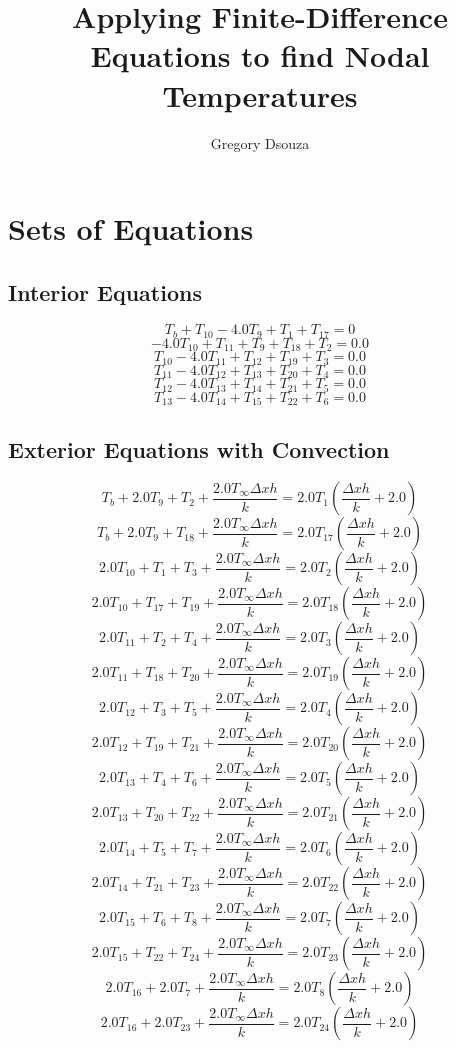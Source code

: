 \documentclass[12pt, stu, floatsintext, hidelinks]{apa7}
\title{Applying Finite-Difference Equations to find Nodal Temperatures}
\author{Gregory Dsouza}
\begin{document}
\clearpage
\maketitle
\tableofcontents
\clearpage

\section{Sets of Equations}
\subsection{Interior Equations}

$$
	T_{b} + T_{10} - 4.0 T_{9} + T_{1} + T_{17} = 0
$$
$$
	- 4.0 T_{10} + T_{11} + T_{9} + T_{18} + T_{2} = 0.0
$$
$$
	T_{10} - 4.0 T_{11} + T_{12} + T_{19} + T_{3} = 0.0
$$
$$
	T_{11} - 4.0 T_{12} + T_{13} + T_{20} + T_{4} = 0.0
$$
$$
	T_{12} - 4.0 T_{13} + T_{14} + T_{21} + T_{5} = 0.0
$$
$$
	T_{13} - 4.0 T_{14} + T_{15} + T_{22} + T_{6} = 0.0
$$


\subsection{Exterior Equations with Convection}

$$
	T_{b} + 2.0 T_{9} + T_{2} + \frac{2.0 T_{\infty} \Delta{x} h}{k} = 2.0 T_{1} \left(\frac{\Delta{x} h}{k} + 2.0\right)
$$
$$
	T_{b} + 2.0 T_{9} + T_{18} + \frac{2.0 T_{\infty} \Delta{x} h}{k} = 2.0 T_{17} \left(\frac{\Delta{x} h}{k} + 2.0\right)
$$
$$
	2.0 T_{10} + T_{1} + T_{3} + \frac{2.0 T_{\infty} \Delta{x} h}{k} = 2.0 T_{2} \left(\frac{\Delta{x} h}{k} + 2.0\right)
$$
$$
	2.0 T_{10} + T_{17} + T_{19} + \frac{2.0 T_{\infty} \Delta{x} h}{k} = 2.0 T_{18} \left(\frac{\Delta{x} h}{k} + 2.0\right)
$$
$$
	2.0 T_{11} + T_{2} + T_{4} + \frac{2.0 T_{\infty} \Delta{x} h}{k} = 2.0 T_{3} \left(\frac{\Delta{x} h}{k} + 2.0\right)
$$
$$
	2.0 T_{11} + T_{18} + T_{20} + \frac{2.0 T_{\infty} \Delta{x} h}{k} = 2.0 T_{19} \left(\frac{\Delta{x} h}{k} + 2.0\right)
$$
$$
	2.0 T_{12} + T_{3} + T_{5} + \frac{2.0 T_{\infty} \Delta{x} h}{k} = 2.0 T_{4} \left(\frac{\Delta{x} h}{k} + 2.0\right)
$$
$$
	2.0 T_{12} + T_{19} + T_{21} + \frac{2.0 T_{\infty} \Delta{x} h}{k} = 2.0 T_{20} \left(\frac{\Delta{x} h}{k} + 2.0\right)
$$
$$
	2.0 T_{13} + T_{4} + T_{6} + \frac{2.0 T_{\infty} \Delta{x} h}{k} = 2.0 T_{5} \left(\frac{\Delta{x} h}{k} + 2.0\right)
$$
$$
	2.0 T_{13} + T_{20} + T_{22} + \frac{2.0 T_{\infty} \Delta{x} h}{k} = 2.0 T_{21} \left(\frac{\Delta{x} h}{k} + 2.0\right)
$$
$$
	2.0 T_{14} + T_{5} + T_{7} + \frac{2.0 T_{\infty} \Delta{x} h}{k} = 2.0 T_{6} \left(\frac{\Delta{x} h}{k} + 2.0\right)
$$
$$
	2.0 T_{14} + T_{21} + T_{23} + \frac{2.0 T_{\infty} \Delta{x} h}{k} = 2.0 T_{22} \left(\frac{\Delta{x} h}{k} + 2.0\right)
$$
$$
	2.0 T_{15} + T_{6} + T_{8} + \frac{2.0 T_{\infty} \Delta{x} h}{k} = 2.0 T_{7} \left(\frac{\Delta{x} h}{k} + 2.0\right)
$$
$$
	2.0 T_{15} + T_{22} + T_{24} + \frac{2.0 T_{\infty} \Delta{x} h}{k} = 2.0 T_{23} \left(\frac{\Delta{x} h}{k} + 2.0\right)
$$
$$
	2.0 T_{16} + 2.0 T_{7} + \frac{2.0 T_{\infty} \Delta{x} h}{k} = 2.0 T_{8} \left(\frac{\Delta{x} h}{k} + 2.0\right)
$$
$$
	2.0 T_{16} + 2.0 T_{23} + \frac{2.0 T_{\infty} \Delta{x} h}{k} = 2.0 T_{24} \left(\frac{\Delta{x} h}{k} + 2.0\right)
$$
\end{document}
